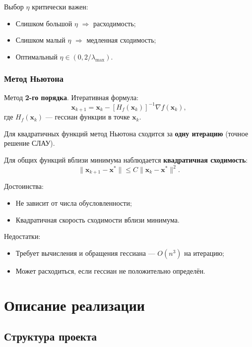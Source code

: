 \documentclass[a4paper, 14pt]{extarticle}
\begin{document}
Выбор $\eta$ критически важен:
\begin{itemize}
    \item Слишком большой $\eta$ $\Rightarrow$ расходимость;
    \item Слишком малый $\eta$ $\Rightarrow$ медленная сходимость;
    \item Оптимальный $\eta \in (0, 2/\lambda_{\max})$.
\end{itemize}

\subsubsection{Метод Ньютона}

Метод \textbf{2-го порядка}. Итеративная формула:
\begin{equation}\label{eq:newton}
    \mathbf{x}_{k+1} = \mathbf{x}_k - [H_f(\mathbf{x}_k)]^{-1} \nabla f(\mathbf{x}_k),
\end{equation}
где $H_f(\mathbf{x}_k)$ --- гессиан функции в точке $\mathbf{x}_k$.

Для квадратичных функций метод Ньютона сходится за \textbf{одну итерацию} (точное решение СЛАУ).

Для общих функций вблизи минимума наблюдается \textbf{квадратичная сходимость}:
\[
    \|\mathbf{x}_{k+1} - \mathbf{x}^*\| \le C \|\mathbf{x}_k - \mathbf{x}^*\|^2.
\]

Достоинства:
\begin{itemize}
    \item Не зависит от числа обусловленности;
    \item Квадратичная скорость сходимости вблизи минимума.
\end{itemize}

Недостатки:
\begin{itemize}
    \item Требует вычисления и обращения гессиана --- $O(n^3)$ на итерацию;
    \item Может расходиться, если гессиан не положительно определён.
\end{itemize}


\section{Описание реализации}

\subsection{Структура проекта}
\end{document}
